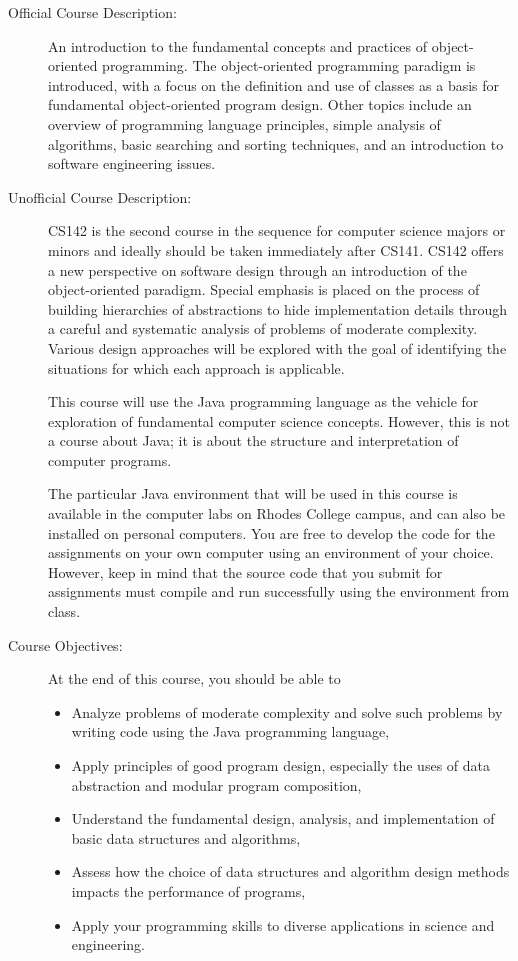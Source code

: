 \documentclass [letterpaper,11pt]{article}
\begin{document}
\begin{description}

\item[Official Course Description:]
An introduction to the fundamental concepts and practices of
object-oriented programming. The object-oriented programming paradigm is introduced,
with a focus on the definition and use of classes as a basis for fundamental object-oriented
program design. Other topics include an overview of programming language principles, simple
analysis of algorithms, basic searching and sorting techniques, and an introduction to
software engineering issues.

\item[Unofficial Course Description:]
CS142 is the second course in the sequence for computer science majors or minors and ideally should be taken immediately after CS141. CS142 offers a new perspective on software design through an introduction of the object-oriented paradigm. Special emphasis is placed on the process of building hierarchies of abstractions to hide implementation details through a careful and systematic analysis of problems of moderate complexity. Various design approaches will be explored with the goal of identifying the situations for which each approach is applicable. 

This course will use the Java programming language as the vehicle for exploration of fundamental computer science concepts. However, this is not a course about Java; it is about the structure and interpretation of computer programs.

The particular Java environment that will be used in this course is available in the computer labs on Rhodes College campus, 
and can also be installed on personal computers.
You are free to develop the code for the assignments on your own computer using an environment of your choice. However, keep in mind that the source code that you submit for assignments must compile and run successfully using the environment from class.

\item[Course Objectives:]
At the end of this course, you should be able to
\begin{itemize} \setlength{\itemsep}{0em}\setlength{\parskip}{0pt}
	\item Analyze problems of moderate complexity and solve such problems by writing code using the Java programming language,
	\item Apply principles of good program design, especially the uses of data abstraction and modular program composition,
	\item Understand the fundamental design, analysis, and implementation of basic data structures and algorithms,
	\item Assess how the choice of data structures and algorithm design methods impacts the performance of programs,
	\item Apply your programming skills to diverse applications in science and engineering.
\end{itemize}




\end{description}
\end{document}
